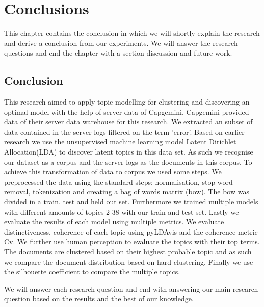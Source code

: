 \chapter{Conclusions} \label{ch:conclusions}
This chapter contains the conclusion in which we will shortly explain the research and derive a conclusion from our experiments. We will answer the research questions and end the chapter with a section discussion and future work.

\section{Conclusion}\label{conclusion:clonclusion}
This research aimed to apply topic modelling for clustering and discovering an optimal model with the help of server data of Capgemini. Capgemini provided data of their server data warehouse for this research. We extracted an subset of data contained in the server logs filtered on the term 'error'. Based on earlier research we use the unsupervised machine learning model Latent Dirichlet Allocation(LDA) to discover latent topics in this data set. As such we recognise our dataset as a corpus and the server logs as the documents in this corpus. To achieve this transformation of data to corpus we used some steps.
We preprocessed the data using the standard steps: normalisation, stop word removal, tokenization and creating a bag of words matrix (bow). The bow was divided in a train, test and held out set. Furthermore we trained multiple models with different amounts of topics {2-38} with our train and test set. Lastly we evaluate the results of each model using multiple metrics. We evaluate distinctiveness, coherence of each topic using pyLDAvis and the coherence metric Cv. We further use human perception to evaluate the topics with their top terms. The documents are clustered based on their highest probable topic and as such we compare the document distribution based on hard clustering. Finally we use the silhouette coefficient to compare the multiple topics. 

We will answer each research question and end with answering our main research question based on the results and the best of our knowledge.

